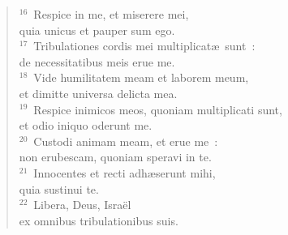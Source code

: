 \begin{verse}
${}^{16}$~Respice in me, et miserere mei,\\ quia unicus et pauper sum ego.\\
${}^{17}$~Tribulationes cordis mei multiplicat\ae\ sunt~:\\ de necessitatibus meis erue me.\\
${}^{18}$~Vide humilitatem meam et laborem meum,\\ et dimitte universa delicta mea.\\
${}^{19}$~Respice inimicos meos, quoniam multiplicati sunt,\\ et odio iniquo oderunt me.\\
${}^{20}$~Custodi animam meam, et erue me~:\\ non erubescam, quoniam speravi in te.\\
${}^{21}$~Innocentes et recti adh\ae serunt mihi,\\ quia sustinui te.\\
${}^{22}$~Libera, Deus, Isra\"el\\ ex omnibus tribulationibus suis.\end{verse}



